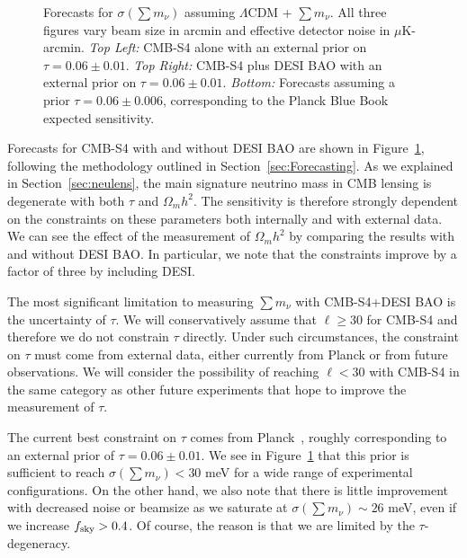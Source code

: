 \begin{figure}[ht]
\begin{center}
\caption{ Forecasts for $\sigma(\sum m_\nu)$ assuming $\Lambda$CDM + $\sum m_\nu$.  All three figures vary beam size in arcmin and effective detector noise in $\mu$K-arcmin. {\it Top Left:} CMB-S4 alone with an external prior on $\tau = 0.06 \pm 0.01$. {\it Top Right: } CMB-S4 plus DESI BAO  with an external prior on $\tau = 0.06 \pm 0.01$.  {\it Bottom:} Forecasts assuming a prior $\tau = 0.06 \pm 0.006$, corresponding to the Planck Blue Book expected sensitivity.}
\label{fig:mnuforecast}
\end{center}
\end{figure} 
 

Forecasts for CMB-S4 with and without DESI BAO are shown in Figure~\ref{fig:mnuforecast}, following the methodology outlined in Section~\ref{sec:Forecasting}.  As we explained in Section~\ref{sec:neulens}, the main signature neutrino mass in CMB lensing is degenerate with both $\tau$ and $\Omega_m h^2$.  The sensitivity is therefore strongly dependent on the constraints on these parameters both internally and with external data.  We can see the effect of the measurement of $\Omega_m h^2$ by comparing the results with and without DESI BAO.  In particular, we note that the constraints improve by a factor of three by including DESI.

The most significant limitation to measuring $\sum m_\nu$ with CMB-S4+DESI BAO is the uncertainty of $\tau$.  We will conservatively assume that $\ell \geq 30$ for CMB-S4 and therefore we do not constrain $\tau$ directly.  Under such circumstances, the constraint on $\tau$ must come from external data, either currently from Planck or from future observations.  We will consider the possibility of reaching $\ell < 30$ with CMB-S4 in the same category as other future experiments that hope to improve the measurement of $\tau$.

The current best constraint on $\tau$ comes from Planck~\cite{Adam:2016hgk}, roughly
corresponding to an external prior of
 $\tau = 0.06 \pm 0.01$.  We see in Figure~\ref{fig:mnuforecast} that
 this prior is sufficient to reach $\sigma(\sum m_\nu) < 30$ meV for a wide range of experimental configurations.  On the other hand, we also note that there is little improvement with decreased noise or beamsize as we saturate at $\sigma(\sum m_\nu) \sim 26$ meV,  even if we increase $f_{\rm sky} >0.4$.  Of course, the reason is that we are limited by the $\tau$-degeneracy.

